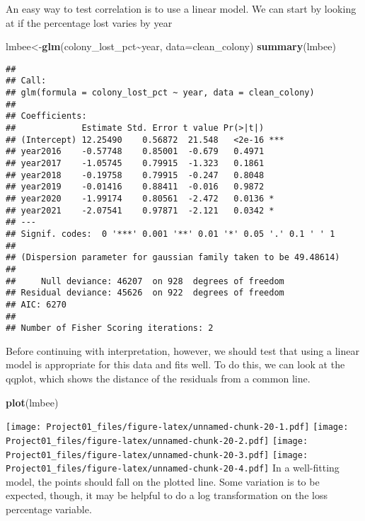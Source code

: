 \documentclass[
]{article}
\newenvironment{Shaded}{\begin{snugshade}}{\end{snugshade}}
\newcommand{\AttributeTok}[1]{\textcolor[rgb]{0.13,0.29,0.53}{#1}}
\newcommand{\FunctionTok}[1]{\textcolor[rgb]{0.13,0.29,0.53}{\textbf{#1}}}
\newcommand{\NormalTok}[1]{#1}
\newcommand{\OtherTok}[1]{\textcolor[rgb]{0.56,0.35,0.01}{#1}}
\newcommand{\SpecialCharTok}[1]{\textcolor[rgb]{0.81,0.36,0.00}{\textbf{#1}}}
\begin{document}
An easy way to test correlation is to use a linear model. We can start
by looking at if the percentage lost varies by year

\begin{Shaded}
\begin{Highlighting}[]
\NormalTok{lmbee}\OtherTok{\textless{}{-}}\FunctionTok{glm}\NormalTok{(colony\_lost\_pct}\SpecialCharTok{\textasciitilde{}}\NormalTok{year, }\AttributeTok{data=}\NormalTok{clean\_colony)}
\FunctionTok{summary}\NormalTok{(lmbee)}
\end{Highlighting}
\end{Shaded}

\begin{verbatim}
## 
## Call:
## glm(formula = colony_lost_pct ~ year, data = clean_colony)
## 
## Coefficients:
##             Estimate Std. Error t value Pr(>|t|)    
## (Intercept) 12.25490    0.56872  21.548   <2e-16 ***
## year2016    -0.57748    0.85001  -0.679   0.4971    
## year2017    -1.05745    0.79915  -1.323   0.1861    
## year2018    -0.19758    0.79915  -0.247   0.8048    
## year2019    -0.01416    0.88411  -0.016   0.9872    
## year2020    -1.99174    0.80561  -2.472   0.0136 *  
## year2021    -2.07541    0.97871  -2.121   0.0342 *  
## ---
## Signif. codes:  0 '***' 0.001 '**' 0.01 '*' 0.05 '.' 0.1 ' ' 1
## 
## (Dispersion parameter for gaussian family taken to be 49.48614)
## 
##     Null deviance: 46207  on 928  degrees of freedom
## Residual deviance: 45626  on 922  degrees of freedom
## AIC: 6270
## 
## Number of Fisher Scoring iterations: 2
\end{verbatim}

Before continuing with interpretation, however, we should test that
using a linear model is appropriate for this data and fits well. To do
this, we can look at the qqplot, which shows the distance of the
residuals from a common line.

\begin{Shaded}
\begin{Highlighting}[]
\FunctionTok{plot}\NormalTok{(lmbee)}
\end{Highlighting}
\end{Shaded}

\texttt{[image: Project01\_files/figure-latex/unnamed-chunk-20-1.pdf]}
\texttt{[image: Project01\_files/figure-latex/unnamed-chunk-20-2.pdf]}
\texttt{[image: Project01\_files/figure-latex/unnamed-chunk-20-3.pdf]}
\texttt{[image: Project01\_files/figure-latex/unnamed-chunk-20-4.pdf]} In
a well-fitting model, the points should fall on the plotted line. Some
variation is to be expected, though, it may be helpful to do a log
transformation on the loss percentage variable.
\end{document}
